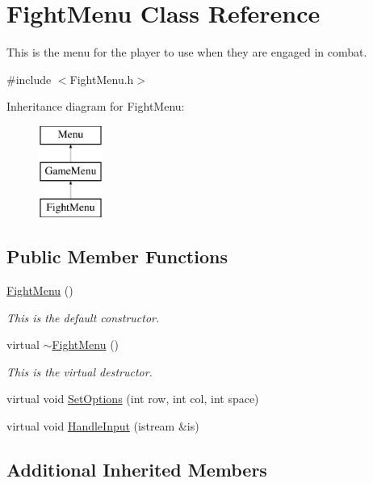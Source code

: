 \hypertarget{classFightMenu}{\section{Fight\-Menu Class Reference}
\label{classFightMenu}
}


This is the menu for the player to use when they are engaged in combat.  




{\ttfamily \#include $<$Fight\-Menu.\-h$>$}

Inheritance diagram for Fight\-Menu\-:\begin{figure}[H]
\begin{center}
\leavevmode
\includegraphics[height=3.000000cm]{classFightMenu}
\end{center}
\end{figure}
\subsection*{Public Member Functions}
\begin{DoxyCompactItemize}
\item 
\hyperlink{classFightMenu_a9f030d9a49e5b81dbaea8eab936cdf80}{Fight\-Menu} ()
\begin{DoxyCompactList}\small\item\em This is the default constructor. \end{DoxyCompactList}\item 
virtual \hyperlink{classFightMenu_a8a8792d7c674b0f19cdc9bf3a5ae96ca}{$\sim$\-Fight\-Menu} ()
\begin{DoxyCompactList}\small\item\em This is the virtual destructor. \end{DoxyCompactList}\item 
virtual void \hyperlink{classFightMenu_a22b8ce181d2f327bd8839315c4843cf5}{Set\-Options} (int row, int col, int space)
\item 
virtual void \hyperlink{classFightMenu_a6d69cf9a19e7bae304d5a116285c1a51}{Handle\-Input} (istream \&is)
\end{DoxyCompactItemize}
\subsection*{Additional Inherited Members}


